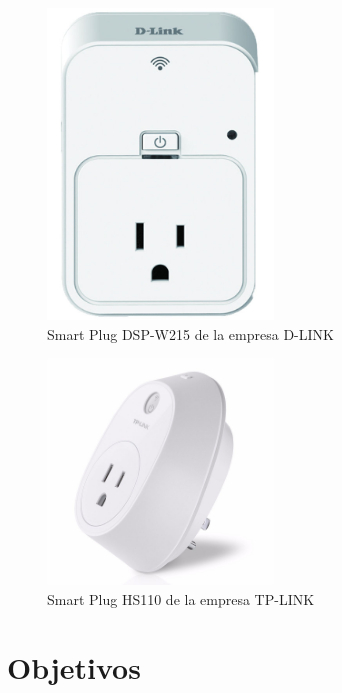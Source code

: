 \begin{figure}[h]
	\centering
	\includegraphics[width=6cm]{./Figures/1_2_DSP-W215.png}
	\caption{Smart Plug DSP-W215 de la empresa D-LINK}
	\label{fig:smartplug_dlink}
\end{figure}

\begin{figure}[h]
	\centering
	\includegraphics[width=6cm]{./Figures/1_2_TP-LINK-HS110.png}
	\caption{Smart Plug HS110 de la empresa TP-LINK}
	\label{fig:smartplug_tplink}
\end{figure}

\section{Objetivos}










